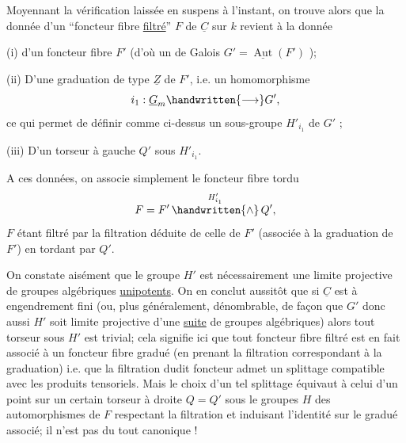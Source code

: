 Moyennant la vérification laissée en suspens à l'instant, on trouve alors que la donnée d'un ``foncteur fibre \uline{filtré}'' $F$ de $\underline{C}$ sur $k$ revient à la donnée

(i) d'un foncteur fibre $F'$  (d'où un  de Galois $G'=\underline{\operatorname{Aut}}(F')$ );

(ii) D'une graduation de type $\underline{Z}$ de $F'$, i.e. un homomorphisme
\[
i_1:\underline{G}_m\handwritten{\longrightarrow}G',
\]
ce qui permet de définir comme ci-dessus un sous-groupe $H'_{i_1}$ de $G'$ ;

(iii) D'un torseur à gauche $Q'$ sous $H'_{i_1}$.

A ces données, on associe simplement le foncteur fibre tordu
\[
F=F'\mathop{\handwritten{\wedge}}\limits^{H'_{i_1}}Q',
\]
$F$ étant filtré par la filtration déduite de celle de $F'$  (associée à la graduation de $F'$) en tordant par $Q'$.


On constate aisément que le groupe $H'$ est nécessairement une limite projective de groupes algébriques \uline{unipotents}. On en conclut aussitôt que si $\underline{C}$ est à engendrement fini (ou, plus généralement,  dénombrable, de façon que $G'$  donc aussi $H'$ soit limite projective d'une \uline{suite} de groupes algébriques) alors tout torseur sous $H'$ est trivial; cela signifie ici que tout foncteur fibre filtré est en fait associé à un foncteur fibre gradué (en prenant la filtration correspondant à la graduation)
%
i.e. que la filtration dudit foncteur admet un splittage compatible avec les produits tensoriels. Mais le choix d'un tel splittage équivaut à celui d'un point  sur un certain torseur à droite $Q=Q'$ sous le  groupes  $H$ des automorphismes de $F$ respectant la filtration et induisant l'identité sur le gradué associé; il n'est pas du tout canonique !

